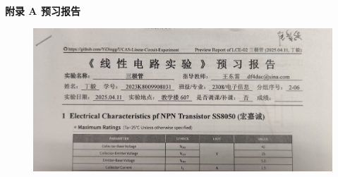 \documentclass[UTF8]{article}
\begin{document}
\newpage
\vspace*{\fill}\begin{center}\Huge{\bfseries 
    附录 A\hspace*{20pt} 预习报告
}\end{center} 
\begin{figure}[H]\centering
    \includegraphics[width=\columnwidth]{LCE-02-三极管/assets/附录/预习报告.png}
\end{figure}
\vspace*{\fill}


\thispagestyle{fancy} 

\end{document}
